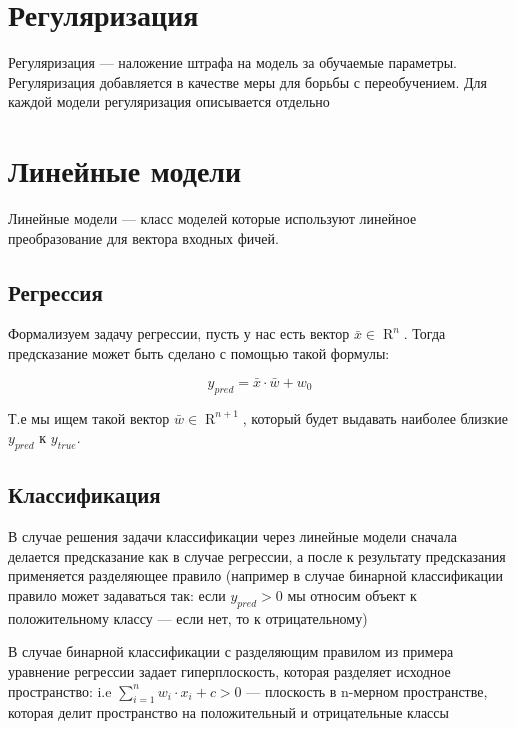 \documentclass{article}
\begin{document}
    \section{Регуляризация}

    Регуляризация --- наложение штрафа на модель за обучаемые параметры. Регуляризация добавляется в качестве меры для борьбы с переобучением. Для каждой модели регуляризация описывается 
    отдельно


    \section{Линейные модели}

    Линейные модели --- класс моделей которые используют линейное преобразование для вектора входных фичей.

    \subsection{Регрессия}

    Формализуем задачу регрессии, пусть у нас есть вектор $\bar{x} \in \operatorname{R}^{n}$.
    Тогда предсказание может быть сделано с помощью такой формулы:

    \begin{equation}
        y_{pred} = \bar{x} \cdot \bar{w} + w_{0}
    \end{equation}

    Т.е мы ищем такой вектор $\bar{w} \in \operatorname{R}^{n + 1}$, который будет выдавать наиболее близкие $y_{pred}$ к $y_{true}$.

    \subsection{Классификация}

    В случае решения задачи классификации через линейные модели сначала делается предсказание как в случае регрессии, а после
    к результату предсказания применяется разделяющее правило (например в случае бинарной классификации правило может задаваться так:
    если $y_{pred} > 0$ мы относим объект к положительному классу --- если нет, то к отрицательному)

    В случае бинарной классификации с разделяющим правилом из примера уравнение регрессии задает гиперплоскость,
    которая разделяет исходное пространство: i.e $\sum_{i = 1}^{n}{w_{i} \cdot x_{i}} + c > 0$ --- плоскость в n-мерном пространстве,
    которая делит пространство на положительный и отрицательные классы
\end{document}
